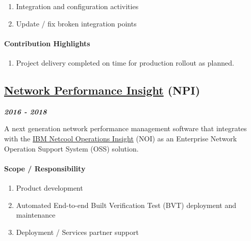 \documentclass[
]{article}
\providecommand{\tightlist}{%
  \setlength{\itemsep}{0pt}\setlength{\parskip}{0pt}}
\begin{document}
\begin{enumerate}
\def\labelenumi{\arabic{enumi}.}
\tightlist
\item
  Integration and configuration activities
\item
  Update / fix broken integration points
\end{enumerate}

\hypertarget{contribution-highlights-6}{%
\paragraph{Contribution Highlights}\label{contribution-highlights-6}}

\begin{enumerate}
\def\labelenumi{\arabic{enumi}.}
\tightlist
\item
  Project delivery completed on time for production rollout as planned.
\end{enumerate}

\hypertarget{network-performance-insight-npi}{%
\subsection{\texorpdfstring{\href{https://www.ibm.com/support/knowledgecenter/en/SSCVHB_1.2.2/product_overview/cnpi_preface_comp_suite1.html}{Network
Performance Insight}
(NPI)}{Network Performance Insight (NPI)}}\label{network-performance-insight-npi}}

\textbf{\emph{2016 - 2018}}

A next generation network performance management software that
integrates with the
\href{http://www-03.ibm.com/software/products/en/netcool-operations-insight}{IBM
Netcool Operations Insight} (NOI) as an Enterprise Network Operation
Support System (OSS) solution.

\hypertarget{scope-responsibility-7}{%
\paragraph{Scope / Responsibility}\label{scope-responsibility-7}}

\begin{enumerate}
\def\labelenumi{\arabic{enumi}.}
\tightlist
\item
  Product development
\item
  Automated End-to-end Built Verification Test (BVT) deployment and
  maintenance
\item
  Deployment / Services partner support
\end{enumerate}
\end{document}
